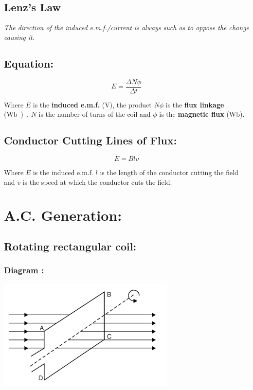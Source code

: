 \documentclass[11pt]{article}
\begin{document}
\subsection{Lenz's Law}

\begin{center}
	\textit{The direction of the induced e.m.f./current is always such as to oppose the change causing it.}
\end{center}

\subsection{Equation: }

\begin{equation}
	E = \frac{\Delta N \phi}{\Delta t}\tag{\si\volt}
\end{equation}
\begin{center}
	Where $E$ is the \textbf{induced e.m.f.} (\si{\volt}), the product $N\phi$ is the \textbf{flux linkage} (\si\weber), $N$ is the number of turns of the coil and  $\phi$ is the \textbf{magnetic flux} (\si{\weber}).
\end{center}
\subsection{Conductor Cutting Lines of Flux: }
\begin{equation}
	E=Blv\tag{\si\volt}
\end{equation}
\begin{center}
	Where $E$ is the induced e.m.f. $l$ is the length of the conductor cutting the field and $v$ is the speed at which the conductor cuts the field.
\end{center}

\section{A.C. Generation: }
\subsection{Rotating rectangular coil: }
\subsubsection{Diagram : }

\begin{center}
	\includegraphics[width=0.5\linewidth]{"pictures/coi"}
\end{center} 
\end{document}
